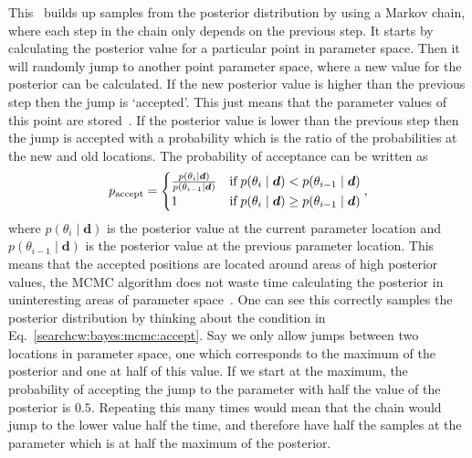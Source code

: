 This~
builds up samples from the posterior distribution by using a Markov chain, where each
step in the chain only depends on the previous step.  
It starts by calculating the posterior value for a particular point in parameter space. Then it will
randomly jump to another point parameter space, where a new value for the
posterior can be calculated.  If the new posterior value is higher than the
previous step then the jump is `accepted'. This just means that the parameter
values of this point are stored~.  If the posterior value is lower than the
previous step then the jump is accepted with a probability which is the ratio of the probabilities at the new and old locations.
The probability of acceptance can be written as
\begin{equation}
\label{searchcw:bayes:mcmc:accept}
	p_{\rm{accept}} = 
	\begin{cases}
		\frac{p(\theta_i \mid \bm{d})}{p(\theta_{i-1} \mid \bm{d})} & \text{if} \; p(\theta_i \mid \bm{d}) < p(\theta_{i-1} \mid \bm{d}) \\
		1 & \text{if} \; p(\theta_i \mid \bm{d}) \geq p(\theta_{i-1} \mid \bm{d}) \\
	\end{cases},
\end{equation}
where $p(\theta_i \mid \bm{d})$ is the posterior value at the current parameter location and $p(\theta_{i-1} \mid \bm{d})$ is the posterior value at the previous parameter location. 
This means that the accepted positions are located around areas of high
posterior values, the \gls{MCMC} algorithm does not waste time calculating the
posterior in uninteresting areas of parameter space~.  
One can see this correctly samples the posterior distribution by thinking about the condition in Eq.~\ref{searchcw:bayes:mcmc:accept}. Say we only allow jumps between two locations in parameter space, one which corresponds to the maximum of the posterior and one at half of this value. 
If we start at the maximum, the probability of accepting the jump to the parameter with half the value of the posterior is $0.5$. Repeating this many times would mean that the chain would jump to the lower value half the time, and therefore have half the samples at the parameter which is at half the maximum of the posterior. 
